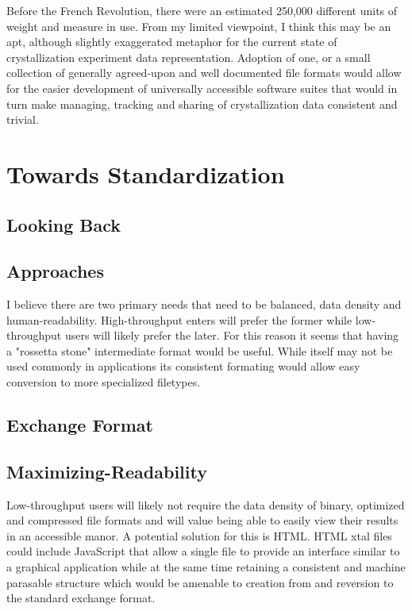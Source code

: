 \documentclass[]{article}
\begin{document}
Before the French Revolution, there were an estimated 250,000 different units of weight and measure in use. From my limited viewpoint, I think this may be an apt, although slightly exaggerated metaphor for the current state of crystallization experiment data representation. Adoption of one, or a small collection of generally agreed-upon and well documented file formats would allow for the easier development of universally accessible software suites that would in turn make managing, tracking and sharing of crystallization data consistent and trivial.

\section{Towards Standardization}

\subsection{Looking Back}

\subsection{Approaches}

I believe there are two primary needs that need to be balanced, data density and human-readability. High-throughput enters will prefer the former while low-throughput users will likely prefer the later. For this reason it seems that having a "rossetta stone" intermediate format would be useful. While itself may not be used commonly in applications its consistent formating would allow easy conversion to more specialized filetypes. 

\subsection{Exchange Format}

\subsection{Maximizing-Readability}

Low-throughput users will likely not require the data density of binary, optimized and compressed file formats and will value being able to easily view their results in an accessible manor. A potential solution for this is HTML. HTML xtal files could include JavaScript that allow a single file to provide an interface similar to a graphical application while at the same time retaining a consistent and machine parasable structure which would be amenable to creation from and reversion to the standard exchange format. 
\end{document}
